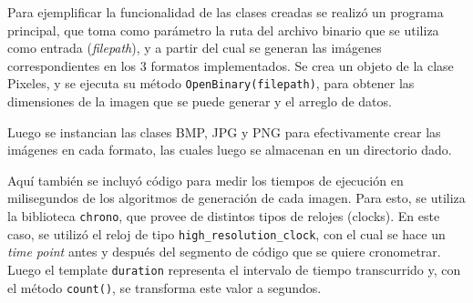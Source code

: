 Para ejemplificar la funcionalidad de las clases creadas se realizó un programa principal, que toma como parámetro la ruta del archivo binario que se utiliza como entrada (\textit{filepath}), y a partir del cual se generan las imágenes correspondientes en los 3 formatos implementados. Se crea un objeto de la clase Pixeles, y se ejecuta su método \texttt{OpenBinary(filepath)}, para obtener las dimensiones de la imagen que se puede generar y el arreglo de datos.

Luego se instancian las clases BMP, JPG y PNG para efectivamente crear las imágenes en cada formato, las cuales luego se almacenan en un directorio dado.

Aquí también se incluyó código para medir los tiempos de ejecución en milisegundos de los algoritmos de generación de cada imagen. Para esto, se utiliza la biblioteca \texttt{chrono}, que provee de distintos tipos de relojes (clocks). En este caso, se utilizó el reloj de tipo \texttt{high\_resolution\_clock}, con el cual se hace un \textit{time point} antes y después del segmento de código que se quiere cronometrar. Luego el template \texttt{duration} representa el intervalo de tiempo transcurrido y, con el método \texttt{count()}, se transforma este valor a segundos.


